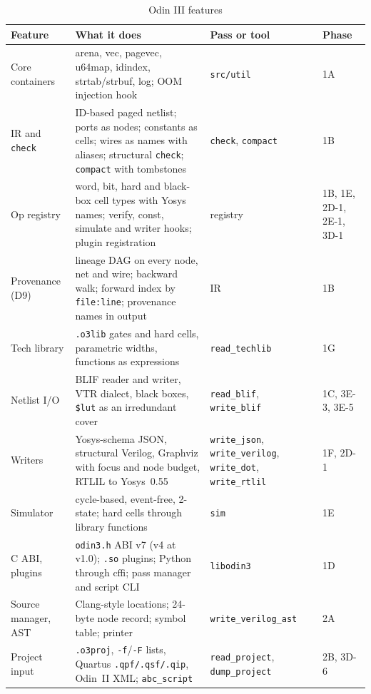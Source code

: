 \documentclass[conference]{IEEEtran}
\newcommand{\code}[1]{\texttt{#1}}
\begin{document}
\begin{table}[!tp]
\caption{Odin III features}
\label{tab:features}
\centering
\footnotesize
\begin{tabular}{@{}>{\raggedright\arraybackslash}p{}%
  >{\raggedright\arraybackslash}p{}%
  >{\raggedright\arraybackslash}p{}p{}@{}}
\toprule
Feature & What it does & Pass or tool & Phase \\
\midrule
Core containers & arena, vec, pagevec, u64map, idindex, strtab/strbuf, log; OOM injection hook
  & \code{src/util} & 1A \\
IR and \code{check} & ID-based paged netlist; ports as nodes; constants as cells; wires as names
  with aliases; structural \code{check}; \code{compact} with tombstones
  & \code{check}, \code{compact} & 1B \\
Op registry & word, bit, hard and black-box cell types with Yosys names; verify, const, simulate
  and writer hooks; plugin registration & registry & 1B, 1E, 2D-1, 2E-1, 3D-1 \\
Provenance (D9) & lineage DAG on every node, net and wire; backward walk; forward index by
  \code{file:line}; provenance names in output & IR & 1B \\
Tech library & \code{.o3lib} gates and hard cells, parametric widths, functions as expressions
  & \code{read\_techlib} & 1G \\
Netlist I/O & BLIF reader and writer, VTR dialect, black boxes, \code{\$lut} as an irredundant
  cover & \code{read\_blif}, \code{write\_blif} & 1C, 3E-3, 3E-5 \\
Writers & Yosys-schema JSON, structural Verilog, Graphviz with focus and node budget, RTLIL to
  Yosys~0.55 & \code{write\_json}, \code{write\_verilog}, \code{write\_dot}, \code{write\_rtlil}
  & 1F, 2D-1 \\
Simulator & cycle-based, event-free, 2-state; hard cells through library functions & \code{sim}
  & 1E \\
C ABI, plugins & \code{odin3.h} ABI v7 (v4 at v1.0); \code{.so} plugins; Python through cffi; pass manager and
  script CLI & \code{libodin3} & 1D \\
Source manager, AST & Clang-style locations; 24-byte node record; symbol table; printer
  & \code{write\_verilog\_ast} & 2A \\
Project input & \code{.o3proj}, \code{-f}/\code{-F} lists, Quartus \code{.qpf/.qsf/.qip},
  Odin~II XML; \code{abc\_script} & \code{read\_project}, \code{dump\_project} & 2B, 3D-6 \\

\end{tabular}
\end{table}
\end{document}
